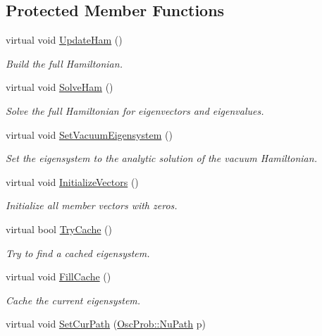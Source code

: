 \subsection*{Protected Member Functions}
\begin{DoxyCompactItemize}
\item 
virtual void \hyperlink{classOscProb_1_1PMNS__Fast_a16248082308f9d2c332ebf1be0aa90c3}{Update\+Ham} ()
\begin{DoxyCompactList}\small\item\em Build the full Hamiltonian. \end{DoxyCompactList}\item 
virtual void \hyperlink{classOscProb_1_1PMNS__Fast_a8a0828401591e88c60e0051fbfe02d5e}{Solve\+Ham} ()
\begin{DoxyCompactList}\small\item\em Solve the full Hamiltonian for eigenvectors and eigenvalues. \end{DoxyCompactList}\item 
virtual void \hyperlink{classOscProb_1_1PMNS__Fast_a76dd5a761df8689c502b28ad0391f9e2}{Set\+Vacuum\+Eigensystem} ()
\begin{DoxyCompactList}\small\item\em Set the eigensystem to the analytic solution of the vacuum Hamiltonian. \end{DoxyCompactList}\item 
virtual void \hyperlink{classOscProb_1_1PMNS__Base_adf23b569112f9f9e0e592f01d79a5f3d}{Initialize\+Vectors} ()
\begin{DoxyCompactList}\small\item\em Initialize all member vectors with zeros. \end{DoxyCompactList}\item 
virtual bool \hyperlink{classOscProb_1_1PMNS__Base_abe533da5f64bec1f4724ab7b58606b77}{Try\+Cache} ()
\begin{DoxyCompactList}\small\item\em Try to find a cached eigensystem. \end{DoxyCompactList}\item 
virtual void \hyperlink{classOscProb_1_1PMNS__Base_a785c37fcea974628623c8881bb0fbbf9}{Fill\+Cache} ()
\begin{DoxyCompactList}\small\item\em Cache the current eigensystem. \end{DoxyCompactList}\item 
virtual void \hyperlink{classOscProb_1_1PMNS__Base_a986e6ebef09a7e2eb7fee16a4c2c834d}{Set\+Cur\+Path} (\hyperlink{structOscProb_1_1NuPath}{Osc\+Prob\+::\+Nu\+Path} p)

\end{DoxyCompactItemize}
